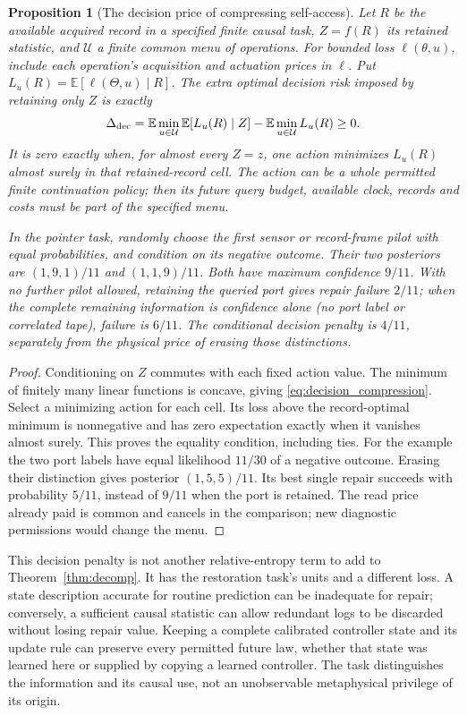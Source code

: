 \documentclass[12pt]{article}
\newtheorem{proposition}[theorem]{Proposition}
\theoremstyle{definition}
\theoremstyle{remark}
\newcommand{\E}{\mathbb E}
\begin{document}
\begin{proposition}[The decision price of compressing self-access]
\label{prop:decision_compression}
Let $R$ be the available acquired record in a specified finite
causal task, $Z=f(R)$ its retained statistic, and $\mathcal U$ a
finite common menu of operations. For bounded loss $\ell(\theta,u)$,
include each operation's acquisition and actuation prices in $\ell$.
Put $L_u(R)=\E[\ell(\Theta,u)\mid R]$. The extra optimal decision
risk imposed by retaining only $Z$ is exactly
\begin{equation}\label{eq:decision_compression}
 \Delta_{\rm dec}
 =\E\min_{u\in\mathcal U}\E[L_u(R)\mid Z]
       -\E\min_{u\in\mathcal U}L_u(R)\ge0.
\end{equation}
It is zero exactly when, for almost every $Z=z$, one action
minimizes $L_u(R)$ almost surely in that retained-record cell.
The action can be a whole permitted finite continuation policy;
then its future query budget, available clock, records and costs
must be part of the specified menu.

In the pointer task, randomly choose the first sensor or
record-frame pilot with equal probabilities, and condition on
its negative outcome. Their two posteriors are
$(1,9,1)/11$ and $(1,1,9)/11$. Both have maximum confidence
$9/11$. With no further pilot allowed, retaining the queried port
gives repair failure $2/11$; when the complete remaining information
is confidence alone (no port label or correlated tape), failure is
$6/11$. The conditional decision penalty is $4/11$, separately
from the physical price of erasing those distinctions.
\end{proposition}
\begin{proof}
Conditioning on $Z$ commutes with each fixed action value. The
minimum of finitely many linear functions is concave, giving
\eqref{eq:decision_compression}. Select a minimizing action for
each cell. Its loss above the record-optimal minimum is
nonnegative and has zero expectation exactly when it vanishes
almost surely. This proves the equality condition, including
ties. For the example the two port labels have equal likelihood
$11/30$ of a negative outcome. Erasing their distinction gives
posterior $(1,5,5)/11$. Its best single repair succeeds with
probability $5/11$, instead of $9/11$ when the port is retained.
The read price already paid is common and cancels in the
comparison; new diagnostic permissions would change the menu.
\end{proof}

This decision penalty is not another relative-entropy term to
add to Theorem~\ref{thm:decomp}. It has the restoration task's units
and a different loss. A state description accurate for routine
prediction can be inadequate for repair; conversely, a sufficient
causal statistic can allow redundant logs to be discarded without
losing repair value. Keeping a complete calibrated controller
state and its update rule can preserve every permitted future
law, whether that state was learned here or supplied by copying
a learned controller. The task distinguishes the information
and its causal use, not an unobservable metaphysical privilege
of its origin.
\end{document}
